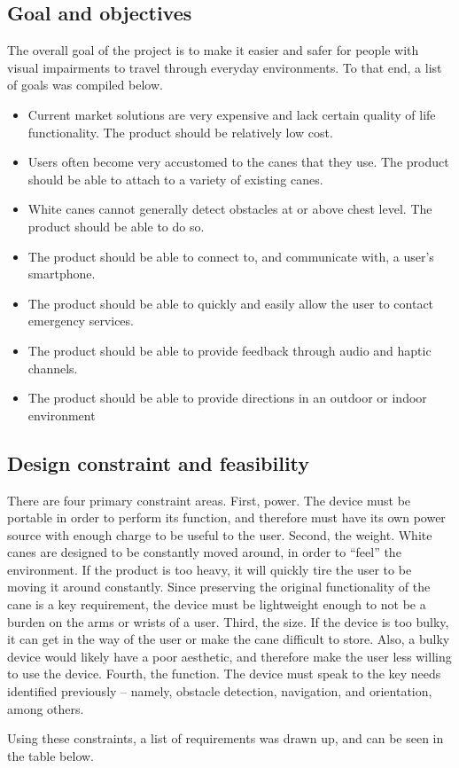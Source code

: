 \documentclass[letterpaper,12pt]{article}
\begin{document}
\subsection{Goal and objectives}

The overall goal of the project is to make it easier and safer for people with visual impairments to travel through everyday environments. To that end, a list of goals was compiled below.\par
\begin{itemize}
    \item Current market solutions are very expensive and lack certain quality of life functionality. The product should be relatively low cost.
    \item Users often become very accustomed to the canes that they use. The product should be able to attach to a variety of existing canes.
    \item White canes cannot generally detect obstacles at or above chest level. The product should be able to do so.
    \item The product should be able to connect to, and communicate with, a user’s smartphone.
    \item The product should be able to quickly and easily allow the user to contact emergency services.
    \item The product should be able to provide feedback through audio and haptic channels.
    \item The product should be able to provide directions in an outdoor or indoor environment
\end{itemize}



\subsection{Design constraint and feasibility}

There are four primary constraint areas. First, power. The device must be portable in order to perform its function, and therefore must have its own power source with enough charge to be useful to the user. 
Second, the weight. White canes are designed to be constantly moved around, in order to “feel” the environment. If the product is too heavy, it will quickly tire the user to be moving it around constantly. Since preserving the original functionality of the cane is a key requirement, the device must be lightweight enough to not be a burden on the arms or wrists of a user.
Third, the size. If the device is too bulky, it can get in the way of the user or make the cane difficult to store. Also, a bulky device would likely have a poor aesthetic, and therefore make the user less willing to use the device.
Fourth, the function. The device must speak to the key needs identified previously – namely, obstacle detection, navigation, and orientation, among others. \par
Using these constraints, a list of requirements was drawn up, and can be seen in the table below. \par
\end{document}
